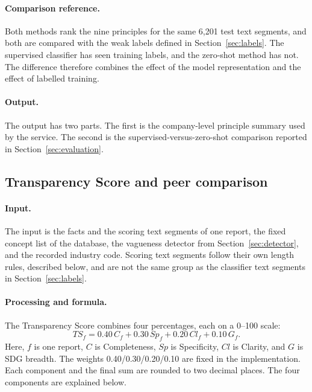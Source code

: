 \paragraph{Comparison reference.} Both methods rank the nine principles for the same 6,201 test text segments, and both are compared with the weak labels defined in Section~\ref{sec:labels}. The supervised classifier has seen training labels, and the zero-shot method has not. The difference therefore combines the effect of the model representation and the effect of labelled training.

\paragraph{Output.} The output has two parts. The first is the company-level principle summary used by the service. The second is the supervised-versus-zero-shot comparison reported in Section~\ref{sec:evaluation}.

\subsection{Transparency Score and peer comparison}
\label{sec:score}

\paragraph{Input.} The input is the facts and the scoring text segments of one report, the fixed concept list of the database, the vagueness detector from Section~\ref{sec:detector}, and the recorded industry code. Scoring text segments follow their own length rules, described below, and are not the same group as the classifier text segments in Section~\ref{sec:labels}.

\paragraph{Processing and formula.} The Transparency Score combines four percentages, each on a 0--100 scale:
\begin{equation}
TS_f=0.40\,C_f+0.30\,Sp_f+0.20\,Cl_f+0.10\,G_f.
\label{eq:ts}
\end{equation}
Here, $f$ is one report, $C$ is Completeness, $Sp$ is Specificity, $Cl$ is Clarity, and $G$ is SDG breadth. The weights 0.40/0.30/0.20/0.10 are fixed in the implementation. Each component and the final sum are rounded to two decimal places. The four components are explained below.

